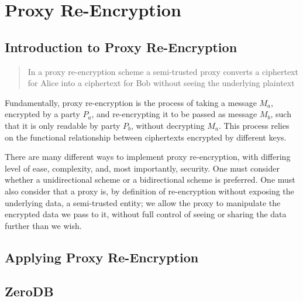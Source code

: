 \section{Proxy Re-Encryption}

\subsection{Introduction to Proxy Re-Encryption}

\blockquote{In a proxy re-encryption scheme a semi-trusted proxy converts a ciphertext for Alice into a ciphertext for Bob without seeing the underlying plaintext}\autocite{greenateniese:2006:article}

Fundamentally, proxy re-encryption is the process of taking a message $M_a$, encrypted by a party $P_a$, and re-encrypting it to be passed as message $M_b$, such that it is only readable by party $P_b$, without decrypting $M_a$. This process relies on the functional relationship between ciphertexts encrypted by different keys.



There are many different ways to implement proxy re-encryption, with differing level of ease, complexity, and, most importantly, security. One must consider whether a unidirectional scheme or a bidirectional scheme is preferred. One must also consider that a proxy is, by definition of re-encryption without exposing the underlying data, a semi-trusted entity; we allow the proxy to manipulate the encrypted data we pass to it, without full control of seeing or sharing the data further than we wish.

\subsection{Applying Proxy Re-Encryption}

\subsection{ZeroDB}
